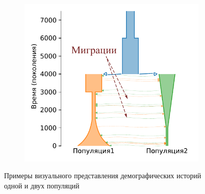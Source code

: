 \begin{figure}[b]
\begin{subfigure}[b]{.33\textwidth}
    \caption{}
    \end{subfigure}%
    \begin{subfigure}[b]{.33\textwidth}
    \includegraphics[width=\textwidth]{images/part1/dem_history/2d_model_migration_fixed.pdf}
    \caption{}
    \end{subfigure}
    \caption{Примеры визуального представления демографических историй одной и двух популяций}
\end{figure}



